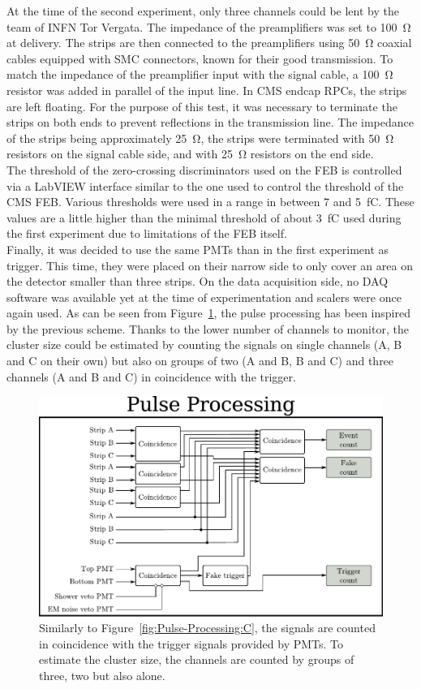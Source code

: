 	At the time of the second experiment, only three channels could be lent by the team of INFN Tor Vergata. The impedance of the preamplifiers was set to \SI{100}{\ohm} at delivery. The strips are then connected to the preamplifiers using \SI{50}{\ohm} coaxial cables equipped with SMC connectors, known for their good transmission. To match the impedance of the preamplifier input with the signal cable, a \SI{100}{\ohm} resistor was added in parallel of the input line. In CMS endcap RPCs, the strips are left floating. For the purpose of this test, it was necessary to terminate the strips on both ends to prevent reflections in the transmission line. The impedance of the strips being approximately \SI{25}{\ohm}, the strips were terminated with \SI{50}{\ohm} resistors on the signal cable side, and with \SI{25}{\ohm} resistors on the end side.\\
	The threshold of the zero-crossing discriminators used on the FEB is controlled via a LabVIEW interface similar to the one used to control the threshold of the CMS FEB. Various thresholds were used in a range in between 7 and \SI{5}{fC}. These values are a little higher than the minimal threshold of about \SI{3}{fC} used during the first experiment due to limitations of the FEB itself.\\
	Finally, it was decided to use the same PMTs than in the first experiment as trigger. This time, they were placed on their narrow side to only cover an area on the detector smaller than three strips. On the data acquisition side, no DAQ software was available yet at the time of experimentation and scalers were once again used. As can be seen from Figure~\ref{fig:Pulse-Processing-904}, the pulse processing has been inspired by the previous scheme. Thanks to the lower number of channels to monitor, the cluster size could be estimated by counting the signals on single channels (A, B and C on their own) but also on groups of two (A and B, B and C) and three channels (A and B and C) in coincidence with the trigger.
	
	\begin{figure}[H]
		\centering
		\includegraphics[width=.9\linewidth]{fig/chapt6/pulse-processing-2014.pdf}
		\caption{\label{fig:Pulse-Processing-904} Similarly to Figure~\ref{fig:Pulse-Processing:C}, the signals are counted in coincidence with the trigger signals provided by PMTs. To estimate the cluster size, the channels are counted by groups of three, two but also alone.}
	\end{figure}
	
